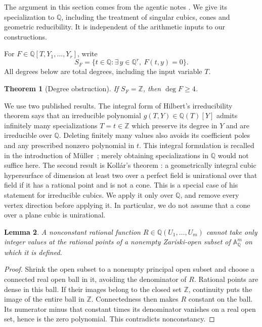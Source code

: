 \documentclass[11pt]{article}
\newtheorem{theorem}{Theorem}[section]
\newtheorem{lemma}[theorem]{Lemma}
\theoremstyle{definition}
\theoremstyle{remark}
\newcommand{\Q}{\mathbb Q}
\newcommand{\Z}{\mathbb Z}
\begin{document}
The argument in this section comes from the agentic notes
\cite[section on unconditional lower bounds]{agentic-improvements}.
We give its specialization to $\Q$, including the treatment of singular
cubics, cones and geometric reducibility.  It is independent of the
arithmetic inputs to our constructions.

For $F\in\Q[T,Y_1,\ldots,Y_r]$, write
\[
 S_F=\{t\in\Q:\exists\,y\in\Q^r,\ F(t,y)=0\}.
\]
All degrees below are total degrees, including the input variable $T$.

\begin{theorem}[Degree obstruction]
\label{thm:degree-four-necessary}
If $S_F=\Z$, then $\deg F\geq4$.
\end{theorem}

We use two published results.  The integral form of Hilbert's
irreducibility theorem says that an irreducible polynomial
$g(T,Y)\in\Q(T)[Y]$ admits infinitely many specializations $T=t\in\Z$
which preserve its degree in $Y$ and are irreducible over $\Q$.
Deleting finitely many values also avoids its coefficient poles and
any prescribed nonzero polynomial in $t$.
This integral formulation is recalled in the introduction of
M\"uller~\cite{Muller2002HIT}; merely obtaining specializations in
$\Q$ would not suffice here.
The second result is Koll\'ar's theorem
\cite[Theorem~2]{Kollar2002Cubic}: a geometrically integral cubic
hypersurface of dimension at least two over a perfect field is
unirational over that field if it has a rational point and is not a cone.
This is a special case of his statement for irreducible cubics.
We apply it only over $\Q$, and remove every vertex direction before
applying it.  In particular, we do not assume that a cone over a plane
cubic is unirational.

\begin{lemma}\label{lem:nonconstant-rational-not-integral}
A nonconstant rational function $R\in\Q(U_1,\ldots,U_m)$ cannot take
only integer values at the rational points of a nonempty Zariski-open
subset of $\mathbb A^m_{\Q}$ on which it is defined.
\end{lemma}
\begin{proof}
Shrink the open subset to a nonempty principal open subset and choose
a connected real open ball in it, avoiding the denominator of $R$.
Rational points are dense in this ball.  If their images belong to the
closed set $\Z$, continuity puts the image of the entire ball in $\Z$.
Connectedness then makes $R$ constant on the ball.  Its numerator minus
that constant times its denominator vanishes on a real open set, hence
is the zero polynomial.  This contradicts nonconstancy.
\end{proof}
\end{document}
